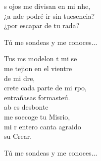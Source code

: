 \begin{cancion}
	s ojos me divisan en mi nhe, \\
	¿a nde podré ir sin tuesencia?  \\
	¿por escapar de tu rada?  \\
	\begin{chorus}%
Tú me sondeas y me conoces... \\
	\end{chorus}%
	Tus ms modelon t mi se\\
	me tejion en el vientre\\
	de mi dre, \\
	crete cada parte de mi rpo, \\
	 entrañasas formasteú. \\
	ab es desbonte \\
	me soecoge tu Misrio, \\
	mi r entero canta agraido \\
	 su Crear. \\
	\begin{chorus}%
Tú me sondeas y me conoces... \\
	\end{chorus}%
\end{cancion}%
